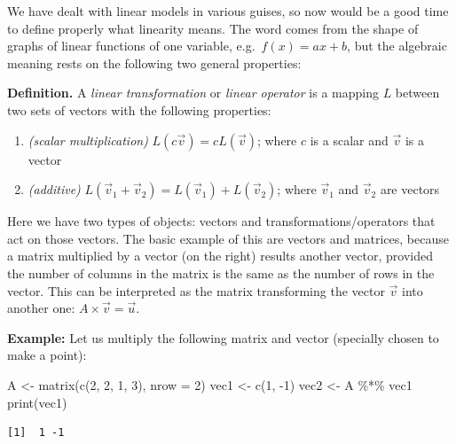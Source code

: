 \documentclass[
  letterpaper,
  DIV=11,
  numbers=noendperiod]{scrreprt}
\newenvironment{Shaded}{\begin{snugshade}}{\end{snugshade}}
\newcommand{\AttributeTok}[1]{\textcolor[rgb]{0.40,0.45,0.13}{#1}}
\newcommand{\DecValTok}[1]{\textcolor[rgb]{0.68,0.00,0.00}{#1}}
\newcommand{\FunctionTok}[1]{\textcolor[rgb]{0.28,0.35,0.67}{#1}}
\newcommand{\NormalTok}[1]{\textcolor[rgb]{0.00,0.23,0.31}{#1}}
\newcommand{\OtherTok}[1]{\textcolor[rgb]{0.00,0.23,0.31}{#1}}
\newcommand{\SpecialCharTok}[1]{\textcolor[rgb]{0.37,0.37,0.37}{#1}}
\providecommand{\tightlist}{%
  \setlength{\itemsep}{0pt}\setlength{\parskip}{0pt}}\usepackage{longtable,booktabs,array}
\begin{document}
We have dealt with linear models in various guises, so now would be a
good time to define properly what linearity means. The word comes from
the shape of graphs of linear functions of one variable,
e.g.~\(f(x) = a x + b\), but the algebraic meaning rests on the
following two general properties:

\textbf{Definition.} A \emph{linear transformation} or \emph{linear
operator} is a mapping \(L\) between two sets of vectors with the
following properties:

\begin{enumerate}
\def\labelenumi{\arabic{enumi}.}
\tightlist
\item
  \emph{(scalar multiplication)} \(L(c \vec v) = c L(\vec v)\); where
  \(c\) is a scalar and \(\vec v\) is a vector
\item
  \emph{(additive)}
  \(L(\vec v_1 + \vec v_2) = L(\vec v_1) + L(\vec v_2)\); where
  \(\vec v_1\) and \(\vec v_2\) are vectors
\end{enumerate}

Here we have two types of objects: vectors and transformations/operators
that act on those vectors. The basic example of this are vectors and
matrices, because a matrix multiplied by a vector (on the right) results
another vector, provided the number of columns in the matrix is the same
as the number of rows in the vector. This can be interpreted as the
matrix transforming the vector \(\vec v\) into another one:
\(A \times \vec v = \vec u\).

\textbf{Example:} Let us multiply the following matrix and vector
(specially chosen to make a point):

\begin{Shaded}
\begin{Highlighting}[]
\NormalTok{A }\OtherTok{\textless{}{-}} \FunctionTok{matrix}\NormalTok{(}\FunctionTok{c}\NormalTok{(}\DecValTok{2}\NormalTok{, }\DecValTok{2}\NormalTok{, }\DecValTok{1}\NormalTok{, }\DecValTok{3}\NormalTok{), }\AttributeTok{nrow =} \DecValTok{2}\NormalTok{)}
\NormalTok{vec1 }\OtherTok{\textless{}{-}} \FunctionTok{c}\NormalTok{(}\DecValTok{1}\NormalTok{, }\SpecialCharTok{{-}}\DecValTok{1}\NormalTok{)}
\NormalTok{vec2 }\OtherTok{\textless{}{-}}\NormalTok{ A }\SpecialCharTok{\%*\%}\NormalTok{ vec1}
\FunctionTok{print}\NormalTok{(vec1)}
\end{Highlighting}
\end{Shaded}

\begin{verbatim}
[1]  1 -1
\end{verbatim}
\end{document}
